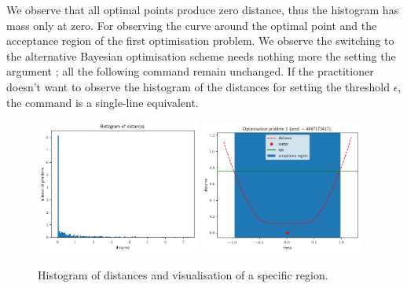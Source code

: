 We observe that all optimal points produce zero distance, thus the histogram has mass only at zero. For observing the curve around the optimal point and the acceptance region of the first optimisation problem. We observe the switching to the alternative Bayesian optimisation scheme needs nothing more the setting the argument ; all the following command remain unchanged. If the practitioner doesn't want to observe the histogram of the distances for setting the threshold $\epsilon$, the command  is a single-line equivalent.

\begin{figure}[h]
    \begin{center}
      \includegraphics[width=0.48\textwidth]{./Thesis/images/chapter3/example_theta_dist.png}
      \includegraphics[width=0.48\textwidth]{./Thesis/images/chapter3/example_region.png}
    \end{center}
  \caption{Histogram of distances and visualisation of a specific region.}
  \label{fig:example_training}
\end{figure}
